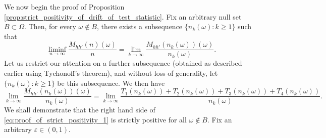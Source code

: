 We now begin the proof of Proposition \ref{prop:strict_positivity_of_drift_of_test_statistic}.
Fix an arbitrary null set $B\subset \Omega$. Then, for every $\omega \notin B$, there exists a subsequence $\{n_k(\omega):k \geq 1\}$ such that
$$\liminf\limits_{n \to \infty} \frac{M_{hh'}(n)( \omega)}{n}=\lim\limits_{k \to \infty} \frac{M_{hh'}(n_k(\omega))( \omega)}{n_k(\omega)}.$$
Let us restrict our attention on a further subsequence (obtained as described earlier using Tychonoff's  theorem), and without loss of generality, let $\{n_k(\omega):k \geq 1\}$ be this subsequence. We then have
\begin{equation}
	\lim\limits_{k \to \infty} \frac{M_{hh'}(n_k(\omega))( \omega)}{n_k(\omega)} =\lim\limits_{k \to \infty}  \frac{T_1(n_k(\omega))+T_2(n_k(\omega))+T_3(n_k(\omega))+T_4(n_k(\omega))}{n_k(\omega)}.
	\label{eq:proof_of_strict_positivity_1}
\end{equation}
We shall demonstrate that the right hand side of \eqref{eq:proof_of_strict_positivity_1} is strictly positive for all $\omega \notin B$. Fix an arbitrary $\varepsilon\in (0,1)$.
